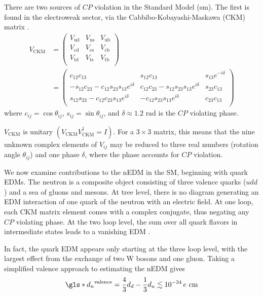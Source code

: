There are two sources of $CP$ violation in the Standard Model (\acrshort*{sm}). The first is found in the electroweak sector, via the Cabbibo-Kobayashi-Maskawa (CKM) matrix \cite{ckm1973, ChauKeung1984, pdg2022}.
%
\begin{align}
    V_\text{CKM} &= \left( \begin{matrix}
    V_\text{ud} & V_\text{us} & V_\text{ub} \\
    V_\text{cd} & V_\text{cs} & V_\text{cb} \\
    V_\text{td} & V_\text{ts} & V_\text{tb} \\
    \end{matrix} \right) \label{eq:CKM} \\
    &= \left( \begin{matrix}
    c_{12}c_{13} & s_{12}c_{13} & s_{13}e^{-i\delta} \\
    -s_{12}c_{23}-c_{12}s_{23}s_{13}e^{i\delta} & c_{12}c_{23}-s_{12}s_{23}s_{13}e^{i\delta} & s_{23}c_{13} \\
    s_{12}s_{23}-c_{12}c_{23}s_{13}e^{i\delta} & -c_{12}s_{23}s_{13}e^{i\delta} & c_{23}c_{13} \\
    \end{matrix} \right)
\end{align}
%
where $c_{ij}=\cos\theta_{ij}$, $s_{ij}=\sin\theta_{ij}$, and $\delta\approx1.2\text{ rad}$ is the $CP$ violating phase.

$V_\text{CKM}$ is unitary $(V_\text{CKM}V_\text{CKM}^\dag=I)$. For a $3 \times 3$ matrix, this means that the nine unknown complex elements of $V_{ij}$ may be reduced to three real numbers (rotation angle $\theta_{ij}$) and one phase $\delta$, where the phase accounts for $CP$ violation.

We now examine contributions to the nEDM in the SM, beginning with quark EDMs. The neutron is a composite object consisting of three valence quarks ($udd$) and a sea of gluons and mesons. At tree level, there is no diagram generating an EDM interaction of one quark of the neutron with an electric field. At one loop, each CKM matrix element comes with a complex conjugate, thus negating any $CP$ violating phase. At the two loop level, the sum over all quark flavors in intermediate states leads to a vanishing EDM \cite{schmidt-wellenburg_quest_2017, czarnecki2018}.

In fact, the quark EDM appears only starting at the three loop level, with the largest effect from the exchange of two W bosons and one gluon. Taking a simplified valence approach to estimating the nEDM gives \cite{czarnecki2018}
%
\begin{gather}
    \gls*{d_n}^\text{valence} = \frac{4}{3}d_d - \frac{1}{3}d_u \lesssim 10^{-34}\,e\text{ cm}
\end{gather}

